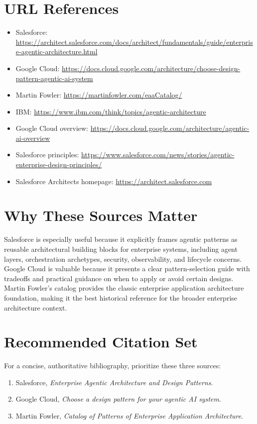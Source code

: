 \documentclass[11pt]{article}
\begin{document}
\section{URL References}
\begin{itemize}[leftmargin=*]
    \raggedright
    \item Salesforce: \url{https://architect.salesforce.com/docs/architect/fundamentals/guide/enterprise-agentic-architecture.html}
    \item Google Cloud: \url{https://docs.cloud.google.com/architecture/choose-design-pattern-agentic-ai-system}
    \item Martin Fowler: \url{https://martinfowler.com/eaaCatalog/}
    \item IBM: \url{https://www.ibm.com/think/topics/agentic-architecture}
    \item Google Cloud overview: \url{https://docs.cloud.google.com/architecture/agentic-ai-overview}
    \item Salesforce principles: \url{https://www.salesforce.com/news/stories/agentic-enterprise-design-principles/}
    \item Salesforce Architects homepage: \url{https://architect.salesforce.com}
\end{itemize}

\section{Why These Sources Matter}
Salesforce is especially useful because it explicitly frames agentic patterns as reusable architectural building blocks for enterprise systems, including agent layers, orchestration archetypes, security, observability, and lifecycle concerns. Google Cloud is valuable because it presents a clear pattern-selection guide with tradeoffs and practical guidance on when to apply or avoid certain designs. Martin Fowler's catalog provides the classic enterprise application architecture foundation, making it the best historical reference for the broader enterprise architecture context.

\section{Recommended Citation Set}
For a concise, authoritative bibliography, prioritize these three sources:
\begin{enumerate}[leftmargin=*]
    \item Salesforce, \textit{Enterprise Agentic Architecture and Design Patterns}.
    \item Google Cloud, \textit{Choose a design pattern for your agentic AI system}.
    \item Martin Fowler, \textit{Catalog of Patterns of Enterprise Application Architecture}.
\end{enumerate}
\end{document}
